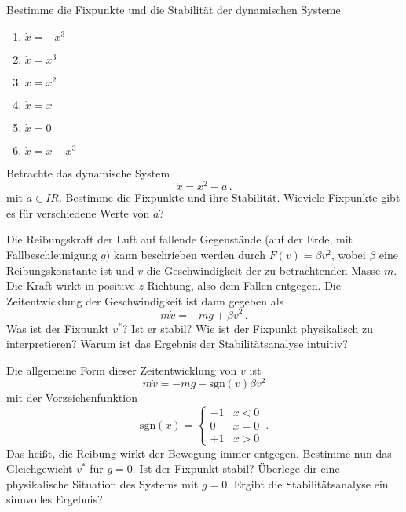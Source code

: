   \subexercise
  Bestimme die Fixpunkte und die Stabilit\"at der dynamischen Systeme
  \begin{enumerate}
      \item $\dot x = - x^3$
      \item $\dot x = x^3$
      \item $\dot x =x^2$
      \item $\dot x = x$
      \item $\dot x = 0$
      \item $\dot x = x-x^3$
  \end{enumerate}
  
  \subexercise[topic=Bifurkation]
  Betrachte das dynamische System
  \begin{equation}
      \dot x = x^2 - a\,.
  \end{equation}
  mit $a\in I\!\!R$.
  Bestimme die Fixpunkte und ihre Stabilit\"at. Wieviele
  Fixpunkte gibt es f\"ur verschiedene Werte von $a$?

  \subexercise[topic=Newton-Reibung]
  Die Reibungskraft der Luft auf fallende Gegenst\"ande (auf der Erde,
  mit Fallbeschleunigung $g$) kann beschrieben
  werden durch  $F(v) = \beta v^2$, wobei $\beta$ eine Reibungskonstante
  ist und $v$ die Geschwindigkeit der zu betrachtenden Masse $m$. Die
  Kraft wirkt in positive $z$-Richtung, also dem Fallen entgegen. Die
  Zeitentwicklung der Geschwindigkeit ist dann gegeben als
  \begin{equation}
      m\dot v = -mg+\beta v^2\,.
  \end{equation}
  Was ist der Fixpunkt $v^*$? Ist er stabil? Wie ist der Fixpunkt physikalisch zu
  interpretieren? Warum ist das Ergebnis der Stabilit\"atsanalyse
  intuitiv?

  Die allgemeine Form dieser Zeitentwicklung von $v$ ist
  \begin{equation}
      m\dot v = -mg-\mathrm{sgn}(v)\beta v^2
  \end{equation}
  mit der Vorzeichenfunktion
  \begin{equation}
      \mathrm{sgn}(x)=\begin{cases}-1 & x<0\\
          0 & x=0\\
          +1 & x>0\end{cases}\,.
  \end{equation}
  Das hei\ss{}t, die Reibung wirkt der Bewegung immer entgegen.
  Bestimme nun das Gleichgewicht $v^*$ f\"ur $g=0$. Ist der Fixpunkt
  stabil? \"Uberlege dir eine physikalische Situation des Systems mit
  $g=0$. Ergibt die Stabilit\"atsanalyse ein sinnvolles Ergebnis?


